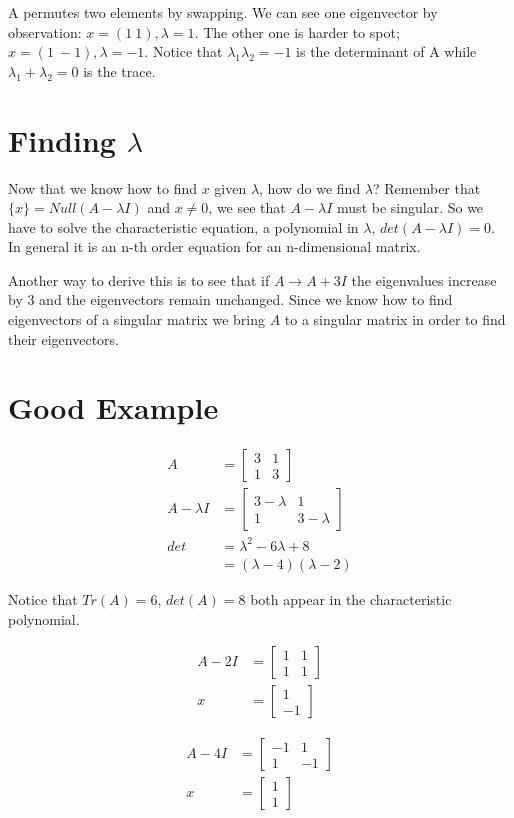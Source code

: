 \documentclass{article}
\begin{document}
A permutes two elements by swapping. We can see one eigenvector by observation:  $x = (1\ 1), \lambda = 1$. The other one is harder to spot; $x = (1\ -1), \lambda = -1$. Notice that $\lambda_1 \lambda_2 = -1$ is the determinant of A while $\lambda_1 + \lambda_2 = 0$ is the trace.

\section{Finding $\lambda$}
Now that we know how to find $x$ given $\lambda$, how do we find $\lambda$? Remember that $\{x\} = Null(A-\lambda I)$ and $x \neq 0$, we see that $A-\lambda I$ must be singular. So we have to solve the characteristic equation, a polynomial in $\lambda$, $det(A-\lambda I) = 0$. In general it is an n-th order equation for an n-dimensional matrix.

Another way to derive this is to see that if $A \rightarrow A + 3I$ the eigenvalues increase by 3 and the eigenvectors remain unchanged. Since we know how to find eigenvectors of a singular matrix we bring $A$ to a singular matrix in order to find their eigenvectors.

\section{Good Example}

\begin{align*}
A &=
\begin{bmatrix} 
3 & 1 \\ 
1 & 3
\end{bmatrix} \\
A - \lambda I &=
\begin{bmatrix} 
3-\lambda & 1 \\ 
1 & 3-\lambda
\end{bmatrix} \\
det &= \lambda^2 - 6\lambda + 8 \\
&= (\lambda-4)(\lambda-2)
\end{align*}

Notice that $Tr(A) = 6$, $det(A) = 8$ both appear in the characteristic polynomial.

\begin{align*}
A - 2I &=
\begin{bmatrix} 
1 & 1 \\ 
1 & 1
\end{bmatrix} \\
x &= 
\begin{bmatrix} 
1\\ 
-1
\end{bmatrix} 
\end{align*}

\begin{align*}
A - 4I &=
\begin{bmatrix} 
-1 & 1 \\ 
1 & -1
\end{bmatrix} \\
x &= 
\begin{bmatrix} 
1\\ 
1
\end{bmatrix} 
\end{align*}
\end{document}
